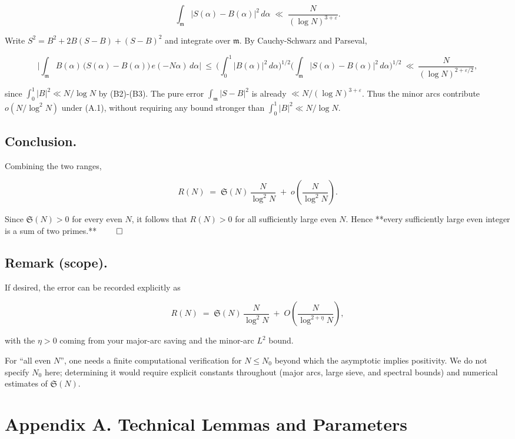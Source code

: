 \documentclass[11pt]{article}
\theoremstyle{definition}
\theoremstyle{remark}
\begin{document}
$$
	\int_{\mathfrak m} |S(\alpha)-B(\alpha)|^2\,d\alpha
	\;\ll\;\frac{N}{(\log N)^{3+\varepsilon}}.
$$

Write $S^2=B^2+2B(S-B)+(S-B)^2$ and integrate over $\mathfrak m$.
By Cauchy-Schwarz and Parseval,

$$
	\Big|\int_{\mathfrak m} B(\alpha)\,\big(S(\alpha)-B(\alpha)\big)\,e(-N\alpha)\,d\alpha\Big|
	\ \le\ \Big(\int_0^1 |B(\alpha)|^2\,d\alpha\Big)^{1/2}
	\Big(\int_{\mathfrak m}|S(\alpha)-B(\alpha)|^2\,d\alpha\Big)^{1/2}
	\ \ll\ \frac{N}{(\log N)^{2+\varepsilon/2}},
$$

since $\int_0^1|B|^2\ll N/\log N$ by (B2)-(B3). The pure error $\int_{\mathfrak m}|S-B|^2$ is already $\ll N/(\log N)^{3+\varepsilon}$. Thus the minor arcs contribute $o\!\left(N/\log^2 N\right)$ under (A.1), without requiring any bound stronger than $\int_0^1|B|^2\ll N/\log N$.

\subsection*{Conclusion.}

Combining the two ranges,

$$
	R(N)
	\;=\;\mathfrak S(N)\,\frac{N}{\log^2 N}\;+\;o\!\left(\frac{N}{\log^2 N}\right).
$$

Since $\mathfrak S(N)>0$ for every even $N$, it follows that $R(N)>0$ for all sufficiently large even $N$. Hence **every sufficiently large even integer is a sum of two primes.** $\qed$

\subsection*{Remark (scope).}
If desired, the error can be recorded explicitly as

$$
	R(N)\;=\;\mathfrak S(N)\,\frac{N}{\log^2 N}\;+\;O\!\left(\frac{N}{\log^{2+\eta}N}\right),
$$

with the $\eta>0$ coming from your major-arc saving and the minor-arc $L^2$ bound.

For “all even $N$”, one needs a finite computational verification for $N\le N_0$ beyond which the asymptotic implies positivity. We do not specify $N_0$ here; determining it would require explicit constants throughout (major arcs, large sieve, and spectral bounds) and numerical estimates of $\mathfrak S(N)$.

\section*{Appendix A. Technical Lemmas and Parameters}
\end{document}
